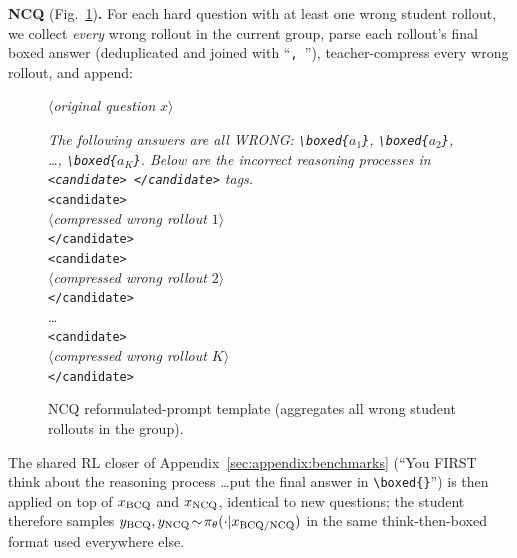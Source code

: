 \noindent\textbf{NCQ} (Fig.~\ref{fig:prompt-ncq})\textbf{.} For each hard question with at least one wrong student rollout, we collect \emph{every} wrong rollout in the current group, parse each rollout's final boxed answer (deduplicated and joined with ``\texttt{, }''), teacher-compress every wrong rollout, and append:
\begin{figure}[!htbp]
\begin{prompttemplatefig}
\small
$\langle$\emph{original question} $x$$\rangle$

\emph{The following answers are all WRONG: \texttt{\textbackslash boxed\{}$a_1$\texttt{\}}, \texttt{\textbackslash boxed\{}$a_2$\texttt{\}}, \dots, \texttt{\textbackslash boxed\{}$a_K$\texttt{\}}. Below are the incorrect reasoning processes in \texttt{<candidate> </candidate>} tags.}\\
\texttt{<candidate>}\\
$\langle$\emph{compressed wrong rollout $1$}$\rangle$\\
\texttt{</candidate>}\\
\texttt{<candidate>}\\
$\langle$\emph{compressed wrong rollout $2$}$\rangle$\\
\texttt{</candidate>}\\
\dots\\
\texttt{<candidate>}\\
$\langle$\emph{compressed wrong rollout $K$}$\rangle$\\
\texttt{</candidate>}
\end{prompttemplatefig}
\caption{NCQ reformulated-prompt template (aggregates all wrong student rollouts in the group).}
\label{fig:prompt-ncq}
\end{figure}
The shared RL closer of Appendix~\ref{sec:appendix:benchmarks} (``You FIRST think about the reasoning process \dots put the final answer in \texttt{\textbackslash boxed\{\}}'') is then applied on top of $x_{\rm BCQ}$ and $x_{\rm NCQ}$, identical to new questions; the student therefore samples $y_{\rm BCQ},y_{\rm NCQ}\!\sim\!\pi_\theta(\cdot|x_{\rm BCQ/NCQ})$ in the same think-then-boxed format used everywhere else.

